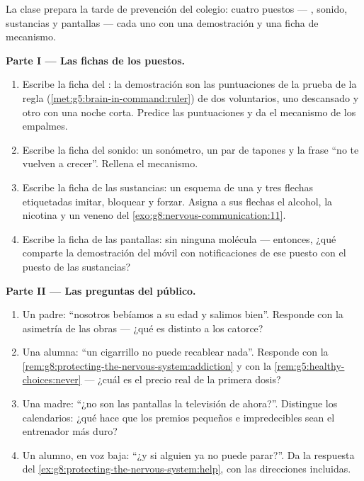 \begin{problem}\label{pb:g8:protecting-the-nervous-system:1}
La clase prepara la tarde de prevención del colegio: cuatro puestos ---
, sonido, sustancias y pantallas --- cada uno con una demostración
y una ficha de mecanismo.

\medskip\noindent\textbf{Parte I --- Las fichas de los puestos.}
\begin{enumerate}
  \item Escribe la ficha del : la demostración son las
        puntuaciones de la prueba de la regla
        (\cref{met:g5:brain-in-command:ruler}) de dos voluntarios, uno
        descansado y otro con una noche corta. Predice las
        puntuaciones y da el mecanismo de los empalmes.
  \item Escribe la ficha del sonido: un sonómetro, un par de tapones y
        la frase ``no te vuelven a crecer''. Rellena el mecanismo.
  \item Escribe la ficha de las sustancias: un esquema de una 
        y tres flechas etiquetadas imitar, bloquear y forzar. Asigna a
        sus flechas el alcohol, la nicotina y un veneno del
        \cref{exo:g8:nervous-communication:11}.
  \item Escribe la ficha de las pantallas: sin ninguna molécula ---
        entonces, ¿qué comparte la demostración del móvil con
        notificaciones de ese puesto con el puesto de las sustancias?
\end{enumerate}

\medskip\noindent\textbf{Parte II --- Las preguntas del público.}
\begin{enumerate}[resume]
  \item Un padre: ``nosotros bebíamos a su edad y salimos bien''.
        Responde con la asimetría de las obras --- ¿qué es distinto a
        los catorce?
  \item Una alumna: ``un cigarrillo no puede recablear nada''.
        Responde con la
        \cref{rem:g8:protecting-the-nervous-system:addiction} y con la
        \cref{rem:g5:healthy-choices:never} --- ¿cuál es el precio real
        de la primera dosis?
  \item Una madre: ``¿no son las pantallas la televisión de ahora?''.
        Distingue los calendarios: ¿qué hace que los premios pequeños e
        impredecibles sean el entrenador más duro?
  \item Un alumno, en voz baja: ``¿y si alguien ya no puede parar?''.
        Da la respuesta del
        \cref{ex:g8:protecting-the-nervous-system:help}, con las
        direcciones incluidas.
\end{enumerate}


\end{problem}
